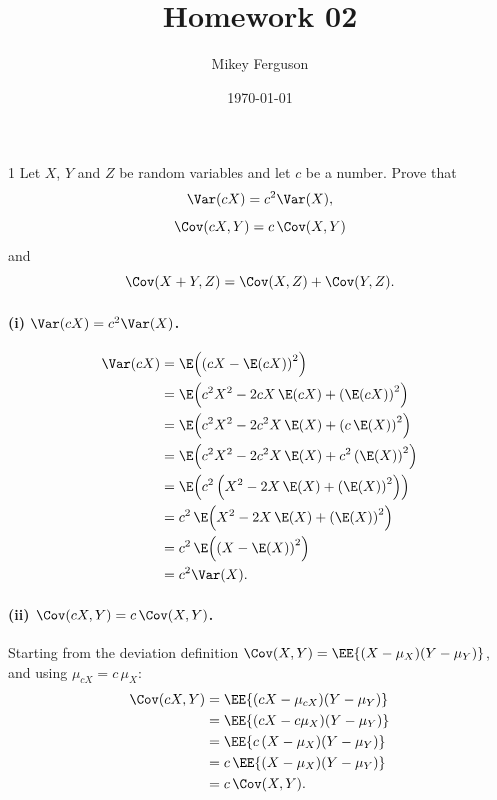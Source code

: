 \documentclass[11pt]{article}
\title{Homework 02}
\author{Mikey Ferguson}
\date{\today}
\begin{document}
\maketitle


\begin{problem}{1}
  Let $X$, $Y$ and $Z$ be random variables and let $c$ be a number. Prove that
  \[
    \Var(cX) = c^{2}\Var(X),
  \]
  \[
    \Cov(cX, Y) = c\,\Cov(X, Y)
  \]
  and
  \[
    \Cov(X + Y, Z) = \Cov(X, Z) + \Cov(Y, Z).
  \]
\end{problem}
\paragraph{(i) $\Var(cX) = c^{2}\Var(X)$.}
\begin{align*}
  \Var(cX)
    &= \E\!\left(\left(cX - \E(cX)\right)^{2}\right)\\
    &= \E\!\left(c^{2}X^{2} - 2cX\,\E(cX) + \left(\E(cX)\right)^{2}\right)\\
    &= \E\!\left(c^{2}X^{2} - 2c^{2}X\,\E(X) + \left(c\,\E(X)\right)^{2}\right)\\
    &= \E\!\left(c^{2}X^{2} - 2c^{2}X\,\E(X) + c^{2}\left(\E(X)\right)^{2}\right)\\
    &= \E\!\left(c^{2}\left(X^{2} - 2X\,\E(X) + \left(\E(X)\right)^{2}\right)\right)\\
    &= c^{2}\,\E\!\left(X^{2} - 2X\,\E(X) + \left(\E(X)\right)^{2}\right)\\
    &= c^{2}\,\E\!\left(\left(X - \E(X)\right)^{2}\right)\\
    &= c^{2}\Var(X).
\end{align*}

\paragraph{(ii) $\Cov(cX,Y) = c\,\Cov(X,Y)$.}
Starting from the deviation definition $\Cov(X,Y) = \EE{(X-\mu_{X})(Y-\mu_{Y})}$, and
using $\mu_{cX} = c\,\mu_{X}$:
\begin{align*}
  \Cov(cX, Y)
    &= \EE{(cX - \mu_{cX})(Y - \mu_{Y})}\\
    &= \EE{(cX - c\mu_{X})(Y - \mu_{Y})}\\
    &= \EE{c\,(X - \mu_{X})(Y - \mu_{Y})}\\
    &= c\,\EE{(X - \mu_{X})(Y - \mu_{Y})}\\
    &= c\,\Cov(X,Y).
\end{align*}
\end{document}

